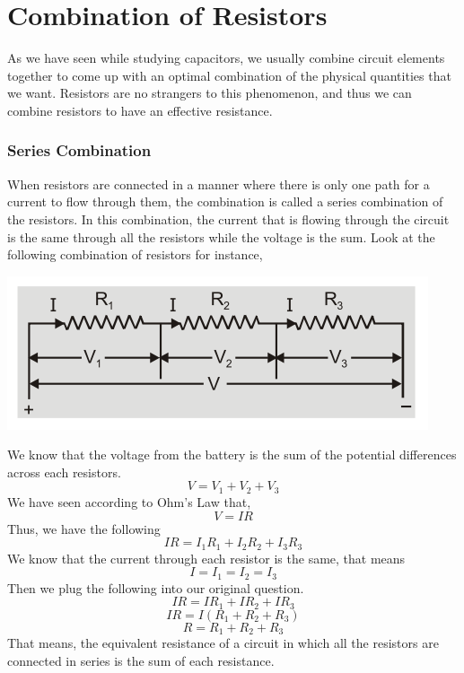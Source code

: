 \documentclass[9pt,addpoints]{exam}
\begin{document}
\section*{Combination of Resistors}
As we have seen while studying capacitors, we usually combine circuit elements together to come up with an optimal combination of the physical quantities that we want. Resistors are no strangers to this phenomenon, and thus we can combine resistors to have an effective resistance.

\subsubsection*{Series Combination}
When resistors are connected in a manner where there is only one path for a current to flow through them, the combination is called a series combination of the resistors. In this combination, the current that is flowing through the circuit is the same through all the resistors while the voltage is the sum. \newline \newline
Look at the following combination of resistors for instance,
\begin{center}
\includegraphics[scale=0.5]{series_resistors.png}	
\end{center}
We know that the voltage from the battery is the sum of the potential differences across each resistors.
$$V = V_1 + V_2 + V_3$$
We have seen according to Ohm's Law that,
$$V=IR$$
Thus, we have the following
$$IR =I_1R_1 + I_2R_2 + I_3R_3$$
We know that the current through each resistor is the same, that means
$$I = I_1 = I_2 = I_3$$
Then we plug the following into our original question.
$$IR =IR_1 + IR_2 + IR_3$$
$$IR =I(R_1 + R_2 + R_3)$$
$$R =R_1 + R_2 + R_3$$
That means, the equivalent resistance of a circuit in which all the resistors are connected in series is the sum of each resistance.
\end{document}
